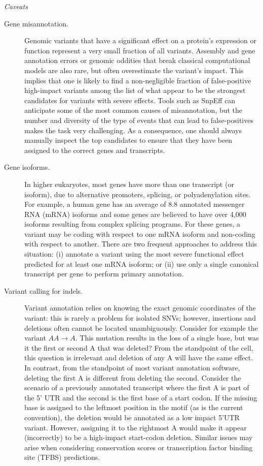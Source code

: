 \textit{Caveats}
	\begin{description}
	
	\item[Gene misannotation.] Genomic variants that have a significant effect on a protein’s expression or function represent a very small fraction of all variants. Assembly and gene annotation errors or genomic oddities that break classical computational models are also rare, but often overestimate the variant’s impact. This implies that one is likely to find a non-negligible fraction of false-positive high-impact variants among the list of what appear to be the strongest candidates for variants with severe effects. Tools such as SnpEff can anticipate some of the most common causes of misannotation, but the number and diversity of the type of events that can lead to false-positives makes the task very challenging. As a consequence, one should always manually inspect the top candidates to ensure that they have been assigned to the correct genes and transcripts.
	
	\item[Gene isoforms.] In higher eukaryotes, most genes have more than one transcript (or isoform), due to alternative promoters, splicing, or polyadenylation sites. For example, a human gene has an average of 8.8 annotated messenger RNA (mRNA) isoforms and some genes are believed to have over 4,000 isoforms resulting from complex splicing programs. For these genes, a variant may be coding with respect to one mRNA isoform and non-coding with respect to another. There are two frequent approaches to address this situation: (i) annotate a variant using the most severe functional effect predicted for at least one mRNA isoform; or (ii) use only a single canonical transcript per gene to perform primary annotation. 
	
	\item[Variant calling for indels.] Variant annotation relies on knowing the exact genomic coordinates of the variant: this is rarely a problem for isolated SNVs; however, insertions and deletions often cannot be located unambiguously. Consider for example the variant $AA \rightarrow A$. This mutation results in the loss of a single base, but was it the first or second A that was deleted? From the standpoint of the cell, this question is irrelevant and deletion of any A will have the same effect. In contrast, from the standpoint of most variant annotation software, deleting the first A is different from deleting the second. Consider the scenario of a previously annotated transcript where the first A is part of the 5' UTR and the second is the first base of a start codon. If the missing base is assigned to the leftmost position in the motif (as is the current convention), the deletion would be annotated as a low impact 5'UTR variant. However, assigning it to the rightmost A would make it appear (incorrectly) to be a high-impact start-codon deletion. Similar issues may arise when considering conservation scores or transcription factor binding site (TFBS) predictions.
	
		\end{description}

